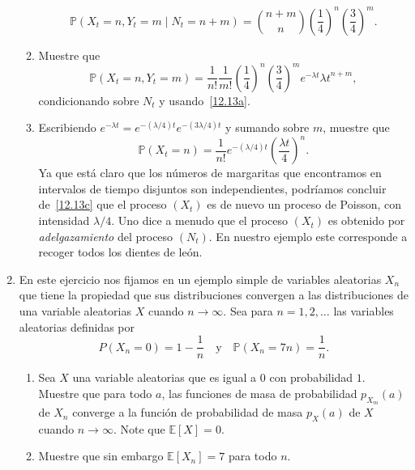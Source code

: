 \begin{enumerate}
\begin{enumerate}
		\begin{equation*}
			\mathds{P}\left(X_t=n,Y_t=m\mid N_t=n+m\right)=\binom{n+m}{n}{\left(\frac{1}{4}\right)}^n{\left(\frac{3}{4}\right)}^m.
		\end{equation*}
		\item Muestre que
		\begin{equation*}
			\mathds{P}\left(X_t=n,Y_t=m\right)=\frac{1}{n!}\frac{1}{m!}{\left(\frac{1}{4}\right)}^n{\left(\frac{3}{4}\right)}^me^{-\lambda t}{\lambda t}^{n+m},
		\end{equation*}
		condicionando sobre $N_t$ y usando~\ref{12.13a}.
		\item Escribiendo $e^{-\lambda t}=e^{-\left(\lambda/4\right)t}e^{-\left(3\lambda/4\right)t}$ y sumando sobre $m$, muestre que\label{12.13c}
		\begin{equation*}
			\mathds{P}\left(X_t=n\right)=\frac{1}{n!}e^{-\left(\lambda/4\right)t}{\left(\frac{\lambda t}{4}\right)}^n.
		\end{equation*}
		Ya que está claro que los números de margaritas que encontramos en intervalos de tiempo disjuntos son independientes, podríamos concluir de~\ref{12.13c} que el proceso $\left(X_t\right)$ es de nuevo un proceso de Poisson, con intensidad $\lambda/4$. Uno dice a menudo que el proceso $\left(X_t\right)$ es obtenido por \emph{adelgazamiento} del proceso $\left(N_t\right)$. En nuestro ejemplo este corresponde a recoger todos los dientes de león.
	\end{enumerate}
	\item En este ejercicio nos fijamos en un ejemplo simple de variables aleatorias $X_n$ que tiene la propiedad que sus distribuciones convergen a las distribuciones de una variable aleatorias $X$ cuando $n\to\infty$. Sea para $n=1,2,\ldots$ las variables aleatorias definidas por
	\begin{equation*}
	P\left(X_n=0\right)=1-\frac{1}{n}\quad\text{y}\quad\mathds{P}\left(X_n=7n\right)=\frac{1}{n}.
	\end{equation*}
	\begin{enumerate}
		\item Sea $X$ una variable aleatorias que es igual a $0$ con probabilidad $1$. Muestre que para todo $a$, las funciones de masa de probabilidad $p_{X_m}(a)$ de $X_n$ converge a la función de probabilidad de masa $p_X(a)$ de $X$ cuando $n\to\infty$. Note que $\mathds{E}\left[X\right]=0$.
		\item Muestre que sin embargo $\mathds{E}\left[X_n\right]=7$ para todo $n$.
	\end{enumerate}
\end{enumerate}
